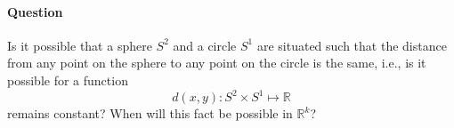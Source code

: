\paragraph{Question} 
Is it possible that a sphere $S^2$ and a circle $S^1$ are situated such that the distance from any point on the sphere to any point on the circle is the same, i.e., is it possible for a function
\[
d(x,y):S^2\times S^1\mapsto\mathbb{R}
\]
remains constant? When will this fact be possible in $\mathbb{R}^k$?


















